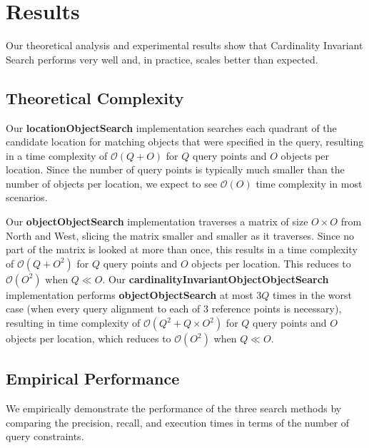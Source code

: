 \section{Results}
\label{section:results}

Our theoretical analysis and experimental results show that Cardinality Invariant Search performs very well and, in practice, scales better than expected.

\subsection{Theoretical Complexity}

Our \textbf{locationObjectSearch} implementation searches each quadrant of the candidate location for matching objects that were specified in the query, resulting in a time complexity of $\mathcal{O}(Q + O)$ for $Q$ query points and $O$ objects per location. 
Since the number of query points is typically much smaller than the number of objects per location, we expect to see $\mathcal{O}(O)$ time complexity in most scenarios.

Our \textbf{objectObjectSearch} implementation traverses a matrix of size $O \times O$ from North and West, slicing the matrix smaller and smaller as it traverses. 
Since no part of the matrix is looked at more than once, this results in a time complexity of $\mathcal{O}(Q + O^2)$ for $Q$ query points and $O$ objects per location. 
This reduces to $\mathcal{O}(O^2)$ when $Q \ll O$. 
Our \textbf{cardinalityInvariantObjectObjectSearch} implementation performs \textbf{objectObjectSearch} at most $3Q$ times in the worst case (when every query alignment to each of 3 reference points is necessary), resulting in time complexity of $\mathcal{O}(Q^2 + Q\times O^2)$ for $Q$ query points and $O$ objects per location, which reduces to $\mathcal{O}(O^2)$ when $Q \ll O$. 


\subsection{Empirical Performance}
We empirically demonstrate the performance of the three search methods by comparing the precision, recall, and execution times in terms of the number of query constraints. 

